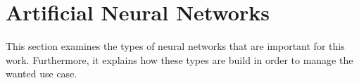 \section{Artificial Neural Networks}
\label{sec:neural-networks}
This section examines the types of neural networks that are important for this work.
Furthermore, it explains how these types are build in order to manage the wanted use case.



